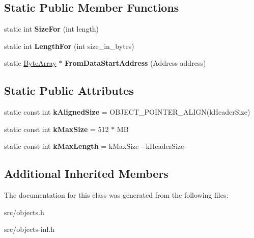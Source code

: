 \subsection*{Static Public Member Functions}
\begin{DoxyCompactItemize}
\item 
\hypertarget{classv8_1_1internal_1_1_byte_array_a0b2f58c92d17d1f72c82bf1116f79c62}{}static int {\bfseries Size\+For} (int length)\label{classv8_1_1internal_1_1_byte_array_a0b2f58c92d17d1f72c82bf1116f79c62}

\item 
\hypertarget{classv8_1_1internal_1_1_byte_array_a59dfeddc28a37ee47271562bdfa3f97b}{}static int {\bfseries Length\+For} (int size\+\_\+in\+\_\+bytes)\label{classv8_1_1internal_1_1_byte_array_a59dfeddc28a37ee47271562bdfa3f97b}

\item 
\hypertarget{classv8_1_1internal_1_1_byte_array_a9397eff4c1809d93e046473f57a30adc}{}static \hyperlink{classv8_1_1internal_1_1_byte_array}{Byte\+Array} $\ast$ {\bfseries From\+Data\+Start\+Address} (Address address)\label{classv8_1_1internal_1_1_byte_array_a9397eff4c1809d93e046473f57a30adc}

\end{DoxyCompactItemize}
\subsection*{Static Public Attributes}
\begin{DoxyCompactItemize}
\item 
\hypertarget{classv8_1_1internal_1_1_byte_array_a2eff4f9abade4d922dd6f82df8c24387}{}static const int {\bfseries k\+Aligned\+Size} = O\+B\+J\+E\+C\+T\+\_\+\+P\+O\+I\+N\+T\+E\+R\+\_\+\+A\+L\+I\+G\+N(k\+Header\+Size)\label{classv8_1_1internal_1_1_byte_array_a2eff4f9abade4d922dd6f82df8c24387}

\item 
\hypertarget{classv8_1_1internal_1_1_byte_array_a3efea1a92b13163d8948ff121732b8ad}{}static const int {\bfseries k\+Max\+Size} = 512 $\ast$ M\+B\label{classv8_1_1internal_1_1_byte_array_a3efea1a92b13163d8948ff121732b8ad}

\item 
\hypertarget{classv8_1_1internal_1_1_byte_array_abb6e4506197d4155b8c9509fd49f13cb}{}static const int {\bfseries k\+Max\+Length} = k\+Max\+Size -\/ k\+Header\+Size\label{classv8_1_1internal_1_1_byte_array_abb6e4506197d4155b8c9509fd49f13cb}

\end{DoxyCompactItemize}
\subsection*{Additional Inherited Members}


The documentation for this class was generated from the following files\+:\begin{DoxyCompactItemize}
\item 
src/objects.\+h\item 
src/objects-\/inl.\+h\end{DoxyCompactItemize}
